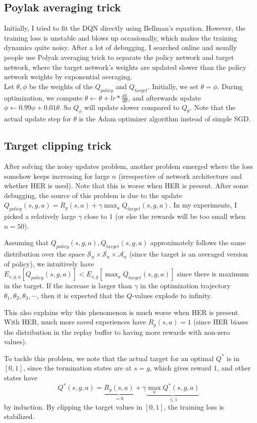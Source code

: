 \documentclass{article}
\begin{document}
\subsection{Poylak averaging trick}
Initially, I tried to fit the DQN directly using Bellman's equation. However, the training loss is unstable and blows up occasionally, which makes the training dynamics quite noisy. After a lot of debugging, I searched online and usually people use Polyak averaging trick to separate the policy network and target network, where the target network's weights are updated slower than the policy network weights by exponential averaging. \\

Let $\theta, \phi$ be the weights of the $Q_{policy}$ and $Q_{target}$. Initially, we set $\theta=\phi$. During optimization, we compute $\theta \leftarrow \theta + lr * \frac{dL}{d\theta}$, and afterwards update $\phi \leftarrow 0.99\phi + 0.01 \theta$. So $Q_\phi$ will update slower compared to $Q_\theta$. Note that the actual update step for $\theta$ is the Adam optimizer algorithm instead of simple SGD.
\subsection{Target clipping trick}
After solving the noisy updates problem, another problem emerged where the loss somehow keeps increasing for large $n$ (irrespective of network architecture and whether HER is used). Note that this is worse when HER is present. After some debugging, the source of this problem is due to the update $Q_{policy}(s,g,a) = R_g(s,a) + \gamma \max_a Q_{target}(s,g,a)$. In my experiments, I picked a relatively large $\gamma$ close to $1$ (or else the rewards will be too small when $n=50$). 

Assuming that $Q_{policy}(s,g,a),Q_{target}(s,g,a)$ approximately follows the same distribution over the space $\mathcal{S}_n \times \mathcal{S}_n \times \mathcal{A}_n$ (since the target is an averaged version of policy), we intuitively have $E_{s,g,a}[Q_{policy}(s,g,a)] < E_{s,g}[\max_a Q_{target}(s,g,a)]$ since there is maximum in the target. If the increase is larger than $\gamma$ in the optimization trajectory $\theta_1,\theta_2,\theta_3,\cdots$, then it is expected that the $Q$-values explode to infinity.

This also explains why this phenomenon is much worse when HER is present. With HER, much more saved experiences have $R_g(s,a)=1$ (since HER biases the distribution in the replay buffer to having more rewards with non-zero values). 

To tackle this problem, we note that the actual target for an optimal $Q^*$ is in $[0,1]$, since the termination states are at $s=g$, which gives reward $1$, and other states have
$$Q^*(s,g,a) = \underbrace{R_g(s,a)}_{=0} + \gamma \underbrace{\max_a Q^*(s,g,a)}_{\leq 1}$$
by induction. By clipping the target values in $[0,1]$, the training loss is stabilized. 
\end{document}
